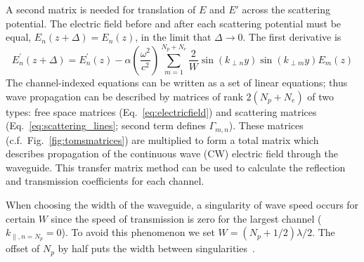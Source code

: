 A second matrix is needed for translation of $E$ and $E'$ across the scattering potential. The electric field before and after each scattering potential must be equal, $E_n(z+\Delta)=E_n(z)$, in the limit that $\Delta \rightarrow 0$. The first derivative is 
\begin{equation}
E_n^{'}(z+\Delta)=E_n^{'}(z)-\alpha\left(\frac{\omega^2}{c^2}\right)\sum_{m=1}^{N_p+N_e}
\frac{2}{W}\sin(k_{\perp n}y)\sin(k_{\perp m}y) E_m(z)
\label{eq:scattering_lines} 
\end{equation}
The channel-indexed equations can be written as a set of linear equations; thus wave propagation can be described by matrices of rank $2 (N_p+N_e)$ of two types: free space matrices (Eq.~\ref{eq:electricfield}) and scattering matrices (Eq.~\ref{eq:scattering_lines}; second term defines $\Gamma_{m,n}$).  These matrices (c.f.~Fig.~\ref{fig:tomsmatrices}) are multiplied to form a total matrix which describes propagation of the continuous wave (CW) electric field through the waveguide. This transfer matrix method can be used to calculate the reflection and transmission coefficients for each channel. 

When choosing the width of the waveguide, a singularity of wave speed occurs for certain $W$ since the speed of transmission is zero for the largest channel ($k_{\parallel,n=N_p}=0$). %
To avoid this phenomenon we set $W = (N_p+1/2)\lambda/2$. The offset of $N_p$ by half puts the width between singularities~\cite{2008_Engheta_PRL}. %

